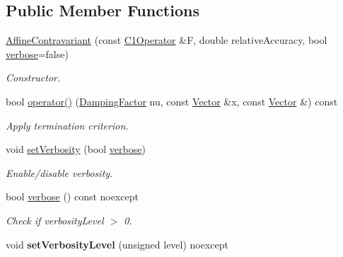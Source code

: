 \subsection*{Public Member Functions}
\begin{DoxyCompactItemize}
\item 
\hyperlink{classSpacy_1_1Newton_1_1Termination_1_1AffineContravariant_a7ae18339e997359b39e7386565d98a8b}{Affine\+Contravariant} (const \hyperlink{classSpacy_1_1C1Operator}{C1\+Operator} \&F, double relative\+Accuracy, bool \hyperlink{classSpacy_1_1Mixin_1_1Verbosity_ad367a7328578546938fd2a7e52ab3793}{verbose}=false)\hypertarget{classSpacy_1_1Newton_1_1Termination_1_1AffineContravariant_a7ae18339e997359b39e7386565d98a8b}{}\label{classSpacy_1_1Newton_1_1Termination_1_1AffineContravariant_a7ae18339e997359b39e7386565d98a8b}

\begin{DoxyCompactList}\small\item\em Constructor. \end{DoxyCompactList}\item 
bool \hyperlink{classSpacy_1_1Newton_1_1Termination_1_1AffineContravariant_a16b9829fd882e948b5d273b80c549f4b}{operator()} (\hyperlink{classSpacy_1_1DampingFactor}{Damping\+Factor} nu, const \hyperlink{classSpacy_1_1Vector}{Vector} \&x, const \hyperlink{classSpacy_1_1Vector}{Vector} \&) const 
\begin{DoxyCompactList}\small\item\em Apply termination criterion. \end{DoxyCompactList}\item 
void \hyperlink{classSpacy_1_1Mixin_1_1Verbosity_a0365d293ab27e27da9496c668020aefb}{set\+Verbosity} (bool \hyperlink{classSpacy_1_1Mixin_1_1Verbosity_ad367a7328578546938fd2a7e52ab3793}{verbose})
\begin{DoxyCompactList}\small\item\em Enable/disable verbosity. \end{DoxyCompactList}\item 
bool \hyperlink{classSpacy_1_1Mixin_1_1Verbosity_ad367a7328578546938fd2a7e52ab3793}{verbose} () const noexcept\hypertarget{classSpacy_1_1Mixin_1_1Verbosity_ad367a7328578546938fd2a7e52ab3793}{}\label{classSpacy_1_1Mixin_1_1Verbosity_ad367a7328578546938fd2a7e52ab3793}

\begin{DoxyCompactList}\small\item\em Check if verbosity\+Level $>$ 0. \end{DoxyCompactList}\item 
void {\bfseries set\+Verbosity\+Level} (unsigned level) noexcept\hypertarget{classSpacy_1_1Mixin_1_1Verbosity_af84a4b3c933f252a5840ab63d4a38325}{}\label{classSpacy_1_1Mixin_1_1Verbosity_af84a4b3c933f252a5840ab63d4a38325}


\end{DoxyCompactItemize}
